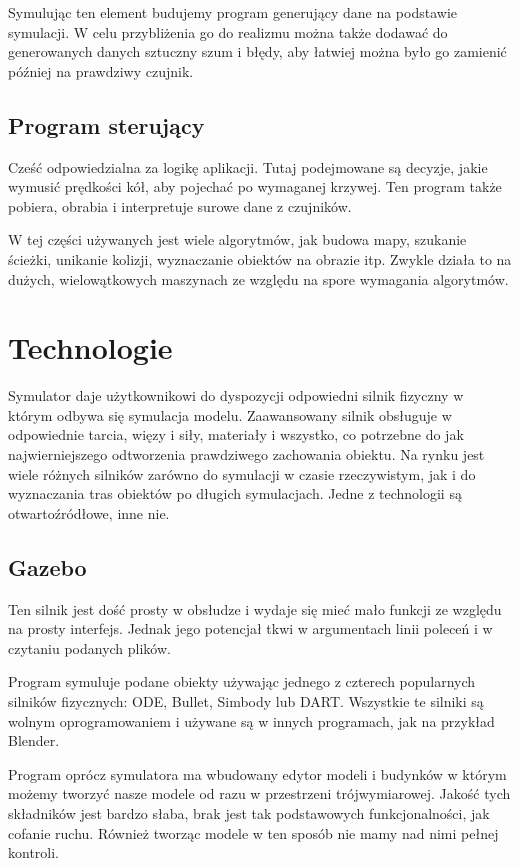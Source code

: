  Symulując ten element budujemy program generujący dane na podstawie symulacji. 
 W celu przybliżenia go do realizmu można także dodawać do generowanych danych sztuczny szum i błędy, aby łatwiej można było go zamienić później na prawdziwy czujnik.
 
\subsection{Program sterujący}
 Cześć odpowiedzialna za logikę aplikacji. Tutaj podejmowane są decyzje, jakie wymusić prędkości kół, aby pojechać po wymaganej krzywej.
 Ten program także pobiera, obrabia i interpretuje surowe dane z czujników.
 
 W tej części używanych jest wiele algorytmów, jak budowa mapy, szukanie ścieżki, unikanie kolizji, wyznaczanie obiektów na obrazie itp.
 Zwykle działa to na dużych, wielowątkowych maszynach ze względu na spore wymagania algorytmów.

\section{Technologie}
Symulator daje użytkownikowi do dyspozycji odpowiedni silnik fizyczny w którym odbywa się symulacja modelu.
Zaawansowany silnik obsługuje w odpowiednie tarcia, więzy i siły, materiały i wszystko, co potrzebne do jak najwierniejszego odtworzenia prawdziwego zachowania obiektu.
Na rynku jest wiele różnych silników zarówno do symulacji w czasie rzeczywistym, jak i do wyznaczania tras obiektów po długich symulacjach.
Jedne z technologii są otwartoźródłowe, inne nie.

\subsection{Gazebo}
Ten silnik jest dość prosty w obsłudze i wydaje się mieć mało funkcji ze względu na prosty interfejs.
Jednak jego potencjał tkwi w argumentach linii poleceń i w czytaniu podanych plików.

Program symuluje podane obiekty używając jednego z czterech popularnych silników fizycznych: ODE, Bullet, Simbody lub DART.
Wszystkie te silniki są wolnym oprogramowaniem i używane są w innych programach, jak na przykład Blender.

Program oprócz symulatora ma wbudowany edytor modeli i budynków w którym możemy tworzyć nasze modele od razu w przestrzeni trójwymiarowej.
Jakość tych składników jest bardzo słaba, brak jest tak podstawowych funkcjonalności, jak cofanie ruchu.
Również tworząc modele w ten sposób nie mamy nad nimi pełnej kontroli.

